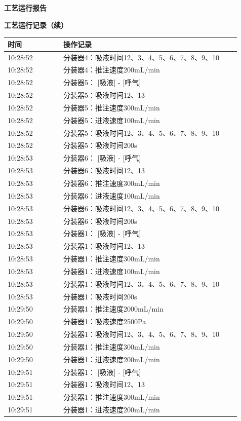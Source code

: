 \documentclass[UTF8,10pt,a4paper,fontset=fandol]{ctexart}
\begin{document}
\begin{center}
\textbf{工艺运行报告}
\end{center}

\noindent
\begin{minipage}[t]{0.47\linewidth}
\scriptsize
\textbf{工艺运行记录（续）}

\begin{tabular}{|p{0.22\linewidth}|p{0.70\linewidth}|}
\hline
时间 & 操作记录 \\ \hline
10:28:52 & 分装器4：吸液时间12、3、4、5、6、7、8、9、10 \\ \hline
10:28:52 & 分装器4：推注速度200mL/min \\ \hline
10:28:52 & 分装器5： [吸液] - [呼气] \\ \hline
10:28:52 & 分装器5：吸液时间12、13 \\ \hline
10:28:52 & 分装器5：推注速度300mL/min \\ \hline
10:28:52 & 分装器5：进液速度100mL/min \\ \hline
10:28:52 & 分装器5：吸液时间12、3、4、5、6、7、8、9、10 \\ \hline
10:28:52 & 分装器5：吸液时间200s \\ \hline
10:28:53 & 分装器6： [吸液] - [呼气] \\ \hline
10:28:53 & 分装器6：吸液时间12、13 \\ \hline
10:28:53 & 分装器6：推注速度300mL/min \\ \hline
10:28:53 & 分装器6：进液速度100mL/min \\ \hline
10:28:53 & 分装器6：吸液时间12、3、4、5、6、7、8、9、10 \\ \hline
10:28:53 & 分装器6：吸液时间200s \\ \hline
10:28:53 & 分装器1： [吸液] - [呼气] \\ \hline
10:28:53 & 分装器1：吸液时间12、13 \\ \hline
10:28:53 & 分装器1：推注速度300mL/min \\ \hline
10:28:53 & 分装器1：进液速度100mL/min \\ \hline
10:28:53 & 分装器1：吸液时间12、3、4、5、6、7、8、9、10 \\ \hline
10:28:53 & 分装器1：吸液时间200s \\ \hline
10:29:50 & 分装器1：推注速度2000mL/min \\ \hline
10:29:50 & 分装器1：吸液速度2500Pa \\ \hline
10:29:50 & 分装器1：吸液时间12、3、4、5、6、7、8、9、10 \\ \hline
10:29:50 & 分装器1：推注速度300mL/min \\ \hline
10:29:50 & 分装器1：进液速度200mL/min \\ \hline
10:29:51 & 分装器1： [吸液] - [呼气] \\ \hline
10:29:51 & 分装器1：吸液时间12、13 \\ \hline
10:29:51 & 分装器1：推注速度300mL/min \\ \hline
10:29:51 & 分装器1：进液速度200mL/min \\ \hline
\end{tabular}
\end{minipage}
\end{document}
